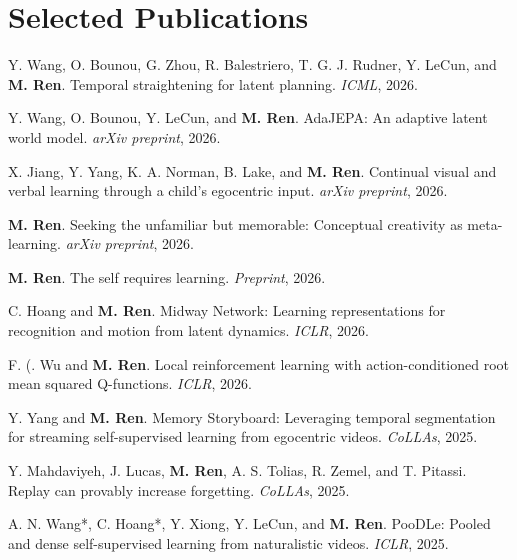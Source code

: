 \section{\sc Selected Publications}
\begin{list2}
\item
Y. Wang, O. Bounou, G. Zhou, R. Balestriero, T. G. J. Rudner, Y. LeCun, and \textbf{M. Ren}.
Temporal straightening for latent planning.
\textit{ICML}, 2026.

\item
Y. Wang, O. Bounou, Y. LeCun, and \textbf{M. Ren}.
AdaJEPA: An adaptive latent world model.
\textit{arXiv preprint}, 2026.

\item
X. Jiang, Y. Yang, K. A. Norman, B. Lake, and \textbf{M. Ren}.
Continual visual and verbal learning through a child’s egocentric input.
\textit{arXiv preprint}, 2026.

\item
\textbf{M. Ren}.
Seeking the unfamiliar but memorable: Conceptual creativity as meta-learning.
\textit{arXiv preprint}, 2026.

\item
\textbf{M. Ren}.
The self requires learning.
\textit{Preprint}, 2026.

\item
C. Hoang and \textbf{M. Ren}.
Midway Network: Learning representations for recognition and motion from latent dynamics.
\textit{ICLR}, 2026.

\item
F. (. Wu and \textbf{M. Ren}.
Local reinforcement learning with action-conditioned root mean squared Q-functions.
\textit{ICLR}, 2026.

\item
Y. Yang and \textbf{M. Ren}.
Memory Storyboard: Leveraging temporal segmentation for streaming self-supervised learning from egocentric videos.
\textit{CoLLAs}, 2025.

\item
Y. Mahdaviyeh, J. Lucas, \textbf{M. Ren}, A. S. Tolias, R. Zemel, and T. Pitassi.
Replay can provably increase forgetting.
\textit{CoLLAs}, 2025.

\item
A. N. Wang*, C. Hoang*, Y. Xiong, Y. LeCun, and \textbf{M. Ren}.
PooDLe: Pooled and dense self-supervised learning from naturalistic videos.
\textit{ICLR}, 2025.


\end{list2}
